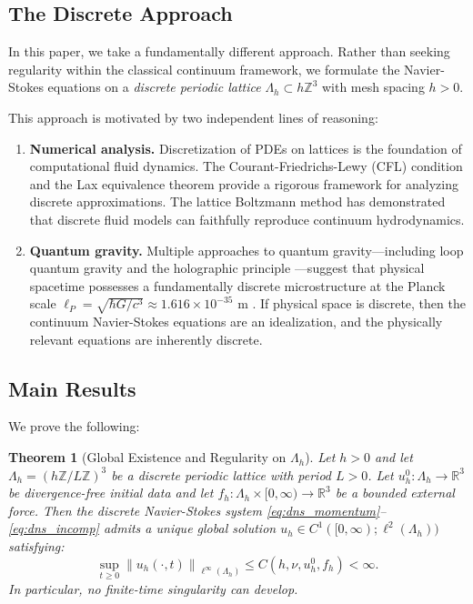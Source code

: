 \documentclass[12pt, a4paper]{article}
\theoremstyle{plain}
\newtheorem{theorem}{Theorem}[section]
\theoremstyle{definition}
\theoremstyle{remark}
\newcommand{\R}{\mathbb{R}}
\newcommand{\Z}{\mathbb{Z}}
\newcommand{\norm}[1]{\left\| #1 \right\|}
\newcommand{\uh}{u_h}
\begin{document}
\subsection{The Discrete Approach}

In this paper, we take a fundamentally different approach. Rather than seeking
regularity within the classical continuum framework, we formulate the
Navier-Stokes equations on a \emph{discrete periodic lattice}
$\Lambda_h \subset h\Z^3$ with mesh spacing $h > 0$.

This approach is motivated by two independent lines of reasoning:

\begin{enumerate}[label=(\roman*)]
  \item \textbf{Numerical analysis.} Discretization of PDEs on lattices is the
    foundation of computational fluid dynamics. The Courant-Friedrichs-Lewy (CFL)
    condition \citep{CFL1928} and the Lax equivalence theorem \citep{Lax1954}
    provide a rigorous framework for analyzing discrete approximations. The lattice
    Boltzmann method \citep{Succi2001, GoldsteinHardyPomeranceTaylor1993} has
    demonstrated that discrete fluid models can faithfully reproduce continuum
    hydrodynamics.

  \item \textbf{Quantum gravity.} Multiple approaches to quantum gravity---including
    loop quantum gravity \citep{Rovelli2004} and the holographic principle
    \citep{tHooft1993}---suggest that physical spacetime possesses a
    fundamentally discrete microstructure at the Planck scale
    $\ell_P = \sqrt{\hbar G / c^3} \approx 1.616 \times 10^{-35}$ m
    \citep{Planck1899}. If physical space is discrete, then the continuum
    Navier-Stokes equations are an idealization, and the physically relevant
    equations are inherently discrete.
\end{enumerate}

\subsection{Main Results}

We prove the following:

\begin{theorem}[Global Existence and Regularity on $\Lambda_h$]\label{thm:main}
  Let $h > 0$ and let $\Lambda_h = (h\Z / L\Z)^3$ be a discrete periodic lattice
  with period $L > 0$. Let $\uh^0 : \Lambda_h \to \R^3$ be divergence-free
  initial data and let $f_h : \Lambda_h \times [0,\infty) \to \R^3$ be a
  bounded external force. Then the discrete Navier-Stokes system
  \eqref{eq:dns_momentum}--\eqref{eq:dns_incomp} admits a unique global
  solution $\uh \in C^1([0,\infty); \ell^2(\Lambda_h))$ satisfying:
  \begin{equation}\label{eq:main_bound}
    \sup_{t \geq 0} \norm{\uh(\cdot, t)}_{\ell^\infty(\Lambda_h)} \leq C(h, \nu, \uh^0, f_h) < \infty.
  \end{equation}
  In particular, no finite-time singularity can develop.
\end{theorem}
\end{document}

